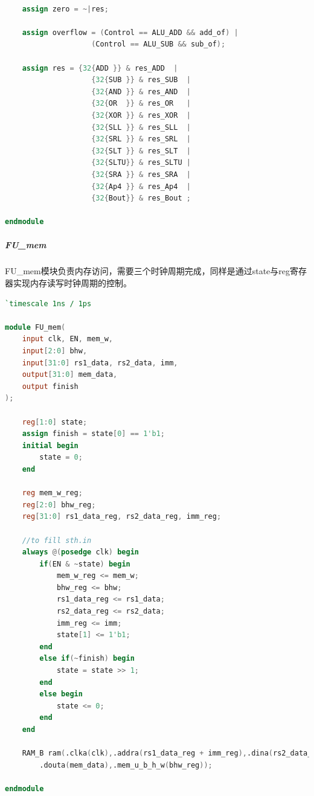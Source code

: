 \begin{lstlisting}[language = {verilog}]
	
	assign zero = ~|res;
	
	assign overflow = (Control == ALU_ADD && add_of) | 
					(Control == ALU_SUB && sub_of);
	
	assign res = {32{ADD }} & res_ADD  |
					{32{SUB }} & res_SUB  |
					{32{AND }} & res_AND  |
					{32{OR  }} & res_OR   |
					{32{XOR }} & res_XOR  |
					{32{SLL }} & res_SLL  |
					{32{SRL }} & res_SRL  |
					{32{SLT }} & res_SLT  |
					{32{SLTU}} & res_SLTU |
					{32{SRA }} & res_SRA  |
					{32{Ap4 }} & res_Ap4  |
					{32{Bout}} & res_Bout ;

endmodule
\end{lstlisting}

\subparagraph{FU\_mem} FU\_mem模块负责内存访问，需要三个时钟周期完成，同样是通过state与reg寄存器实现内存读写时钟周期的控制。
\begin{lstlisting}[language = {verilog}]
`timescale 1ns / 1ps

module FU_mem(
	input clk, EN, mem_w,
	input[2:0] bhw,
	input[31:0] rs1_data, rs2_data, imm,
	output[31:0] mem_data,
	output finish
);

	reg[1:0] state;
	assign finish = state[0] == 1'b1;
	initial begin
		state = 0;
	end

	reg mem_w_reg;
	reg[2:0] bhw_reg;
	reg[31:0] rs1_data_reg, rs2_data_reg, imm_reg;

	//to fill sth.in
	always @(posedge clk) begin
		if(EN & ~state) begin
			mem_w_reg <= mem_w;
			bhw_reg <= bhw;
			rs1_data_reg <= rs1_data;
			rs2_data_reg <= rs2_data;
			imm_reg <= imm;
			state[1] <= 1'b1;
		end
		else if(~finish) begin
			state = state >> 1;
		end
		else begin
			state <= 0;
		end
	end

	RAM_B ram(.clka(clk),.addra(rs1_data_reg + imm_reg),.dina(rs2_data_reg),.wea(mem_w_reg),
		.douta(mem_data),.mem_u_b_h_w(bhw_reg));

endmodule
\end{lstlisting}

